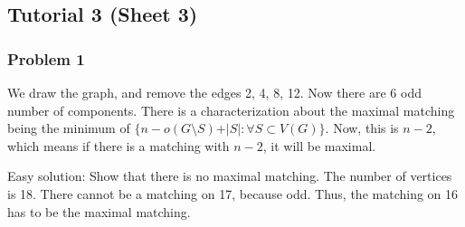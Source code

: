 \documentclass[11pt]{article}
\begin{document}
\subsection{Tutorial 3 (Sheet 3)}
\label{sec:org8b9c110}
\subsubsection{Problem 1}
\label{sec:orgc99a195}
We draw the graph, and remove the edges 2, 4, 8, 12. Now there are 6 odd
number of components. There is a characterization about the maximal matching
being the minimum of \(\{n - o(G\setminus S) + \vert S\vert\colon \forall S
    \subset V(G)\}\). Now, this is \(n-2\), which means if there is a matching with
\(n-2\), it will be maximal.

Easy solution: Show that there is no maximal matching. The number of
vertices is 18. There cannot be a matching on 17, because odd. Thus, the
matching on 16 has to be the maximal matching.
\end{document}
